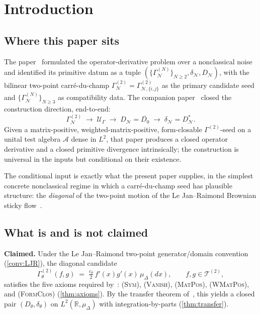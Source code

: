 \documentclass[11pt,reqno]{amsart}
\theoremstyle{plain}
\theoremstyle{definition}
\theoremstyle{remark}
\newcommand{\R}{\mathbb{R}}
\newcommand{\cA}{\mathcal A}
\newcommand{\cN}{\mathcal N}
\newcommand{\cT}{\mathcal T}
\newcommand{\cU}{\mathcal U}
\newcommand{\Dth}{D_{\theta}}
\newcommand{\divth}{\delta_{\theta}}
\begin{document}
\maketitle

\section{Introduction}\label{sec:intro}

\subsection{Where this paper sits}\label{sec:intro-where}

The paper~\cite{PrimitiveDivergence} formulated the
operator-derivative problem over a nonclassical noise and
identified its primitive datum as a tuple
$(\{\Gamma^{(N)}_{\cN}\}_{N\ge 2},\delta_{\cN},D_{\cN})$, with
the bilinear two-point carr\'e-du-champ
$\Gamma_{\cN}^{(2)}=\Gamma^{(2)}_{\cN,\{i,j\}}$ as the primary
candidate seed and
$\{\Gamma^{(N)}_{\cN}\}_{N\ge 3}$ as compatibility data. The
companion paper~\cite{GammaHierarchyDivergence} closed the
construction direction, end-to-end:
\[
  \Gamma^{(2)}_{\cN}
  \;\longrightarrow\;
  \cU_{\Gamma}
  \;\longrightarrow\;
  D_{\cN}=\overline{D_{0}}
  \;\longrightarrow\;
  \delta_{\cN}=D_{\cN}^{*}.
\]
Given a matrix-positive, weighted-matrix-positive, form-closable
$\Gamma^{(2)}$-seed on a unital test algebra $\cA$ dense in
$L^{2}$, that paper produces a closed operator derivative and a
closed primitive divergence intrinsically; the construction is
universal in the inputs but conditional on their existence.

The conditional input is exactly what the present paper supplies,
in the simplest concrete nonclassical regime in which a
carr\'e-du-champ seed has plausible structure: the
\emph{diagonal} of the two-point motion of the Le
Jan--Raimond Brownian sticky flow~\cite{LeJanRaimond2004}.

\subsection{What is and is not claimed}\label{sec:intro-claims}

\textbf{Claimed.} Under the Le Jan--Raimond two-point
generator/domain convention (\cref{conv:LJR}), the diagonal
candidate
\begin{equation}\label{eq:Gamma-theta-intro}
  \Gamma^{(2)}_{\theta}(f,g)
  \;=\;\tfrac{c_{\theta}}{2}\,f'(x)g'(x)\,\mu_{\Delta}(dx),
  \qquad f,g\in\cT^{(2)},
\end{equation}
satisfies the five axioms required
by~\cite{GammaHierarchyDivergence}:
\textsc{(Sym)},
\textsc{(Vanish)},
\textsc{(MatPos)},
\textsc{(WMatPos)}, and
\textsc{(FormClos)} (\cref{thm:axioms}). By the transfer theorem
of~\cite{GammaHierarchyDivergence}, this yields a closed pair
$(\Dth,\divth)$ on $L^{2}(\R,\mu_{\Delta})$ with
integration-by-parts (\cref{thm:transfer}).
\end{document}
